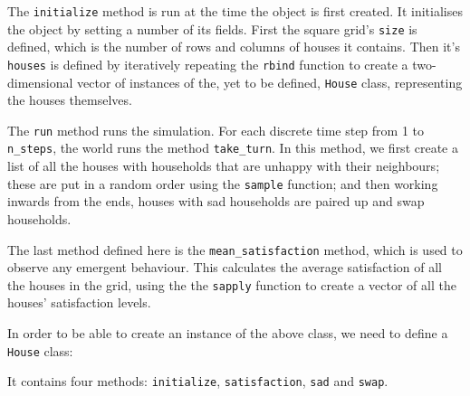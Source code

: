 The \texttt{initialize} method is run at the time the object is first
created.
It initialises the object by setting a number of its fields.
First the square grid's \texttt{size} is defined, which is the
number of rows and columns of houses it contains.
Then it's \texttt{houses} is defined by iteratively repeating the
\texttt{rbind} function to create a two-dimensional vector of instances
of the, yet to be defined, \texttt{House} class, representing the houses
themselves.

The \texttt{run} method runs the simulation. For each discrete time
step from 1 to \texttt{n_steps}, the world runs the method
\texttt{take_turn}.
In this method, we first create a list of all the houses with households that
are unhappy with their neighbours; these are put in a random order using the
\texttt{sample} function; and then working inwards from the ends,
houses with sad households are paired up and swap households.

The last method defined here is the \texttt{mean_satisfaction}
method, which is used to observe any emergent behaviour.
This calculates the average satisfaction of all the houses in the grid, using
the the \texttt{sapply} function to create a vector of all the houses'
satisfaction levels.

In order to be able to create an instance of the above class, we need to define
a \texttt{House} class:


It contains four methods: \texttt{initialize},
\texttt{satisfaction}, \texttt{sad} and \texttt{swap}.

